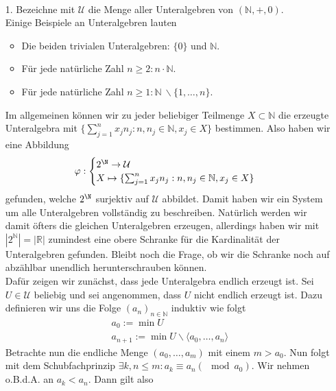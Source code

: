 \begin{solution}
\leavevmode \\
\begin{itemize}
  \item [1.] Bezeichne mit $\mathcal{U}$ die Menge aller Unteralgebren
  von $(\mathbb{N},+,0)$. \\
  Einige Beispiele an Unteralgebren lauten
  \begin{itemize}
    \item Die beiden trivialen Unteralgebren: $\{0\}$ und $\mathbb{N}$.
    \item Für jede natürliche Zahl $n \geq 2: n\cdot\mathbb{N}$.
    \item Für jede natürliche Zahl $n \geq 1: \mathbb{N}~\backslash\{1,\dots,n\}$.
  \end{itemize}
Im allgemeinen können wir zu jeder beliebiger Teilmenge $X \subset \mathbb{N}$
die erzeugte Unteralgebra mit $\{\sum_{j=1}^nx_jn_j: n, n_j \in \mathbb{N}, x_j \in X \}$
bestimmen. Also haben wir eine Abbildung
\begin{align*}
  \varphi: \begin{cases}
    2^\N \rightarrow \mathcal{U} \\
    X \mapsto \{\sum_{j=1}^nx_jn_j: n, n_j \in \mathbb{N}, x_j \in X \}
  \end{cases}
\end{align*}
gefunden, welche $2^\N$ surjektiv auf $\mathcal{U}$ abbildet.
Damit haben wir ein System um alle Unteralgebren vollständig zu beschreiben.
Natürlich werden wir damit öfters die gleichen Unteralgebren erzeugen,
allerdings haben wir mit $|2^{\mathbb{N}}| = |\mathbb{R}|$ zumindest eine obere
Schranke für die Kardinalität der Unteralgebren gefunden. Bleibt noch die Frage,
ob wir die Schranke noch auf abzählbar unendlich herunterschrauben können. \\
Dafür zeigen wir zunächst, dass jede Unteralgebra endlich erzeugt ist.
Sei $U \in \mathcal{U}$ beliebig und sei angenommen,
dass $U$ nicht endlich erzeugt ist.
Dazu definieren wir uns die Folge $(a_n)_{n \in \mathbb{N}}$ induktiv wie folgt
\begin{align*}
  a_0 := \min U \\
a_{n+1} := \min U \backslash \langle a_0,\dots,a_n\rangle
\end{align*}
Betrachte nun die endliche Menge $(a_0,\dots,a_m)$ mit einem $m > a_0$.
Nun folgt mit dem Schubfachprinzip $\exists k,n \leq m: a_k \equiv a_n (\mod a_0)$.
Wir nehmen o.B.d.A. an $a_k < a_n$. Dann gilt also
\begin{align*}

\end{align*}
\end{itemize}
\end{solution}
